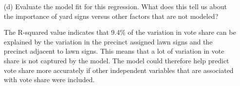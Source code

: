 \documentclass[12pt,letterpaper]{article}
\begin{document}
\begin{enumerate}
	\item [(d)] Evaluate the model fit for this regression.  What does this	tell us about the importance of yard signs versus other factors that are not modeled?
	
	\vspace*{0.5cm}
	\noindent
	The R-squared value indicates that 9.4\% of the variation in vote share can be explained by the variation in the precinct assigned lawn signs and the precinct adjacent to lawn signs. This means that a lot of variation in vote share is not captured by the model. The model could therefore help predict vote share more accurately if other independent variables that  are associated with vote share were included.
\end{enumerate}  
\end{document}
